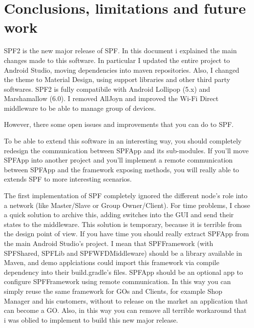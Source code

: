 \chapter{Conclusions, limitations and future work}
\label{conclusion}

SPF2 is the new major release of SPF. In this document i explained the main changes made to this software. In particular I updated the entire project to Android Studio, moving dependencies into maven repositories. Also, I changed the theme to Material Design, using support libraries and other third party softwares. SPF2 is fully compatibile with Android Lollipop (5.x) and Marshamallow (6.0). I removed AllJoyn and improved the Wi-Fi Direct middleware to be able to manage group of devices.


However, there some open issues and improvements that you can do to SPF.

To be able to extend this software in an interesting way, you should completely redesign the communication between SPFApp and its sub-modules. If you'll move SPFApp into another project and you'll implement a remote communication between SPFApp and the framework exposing methods, you will really able to extends SPF to more interesting scenarios.

The first implementation of SPF completely ignored the different node's role into a network (like Master/Slave or Group Owner/Client). For time problems, I chose a quick solution to archive this, adding switches into the GUI and send their states to the middleware. This solution is temporary, because it is terrible from the design point of view. If you have time you should really extract SPFApp from the main Android Studio's project. I mean that SPFFramework (with SPFShared, SPFLib and SPFWFDMiddleware) should be a library available in Maven, and demo applciations could import this framework via compile dependency into their build.gradle's files. SPFApp should be an optional app to configure SPFFramework using remote communication. In this way you can simply reuse the same framework for GOs and Clients, for example Shop Manager and his customers, without to release on the market an application that can become a GO. Also, in this way you can remove all terrible workaround that i was oblied to implement to build this new major release.